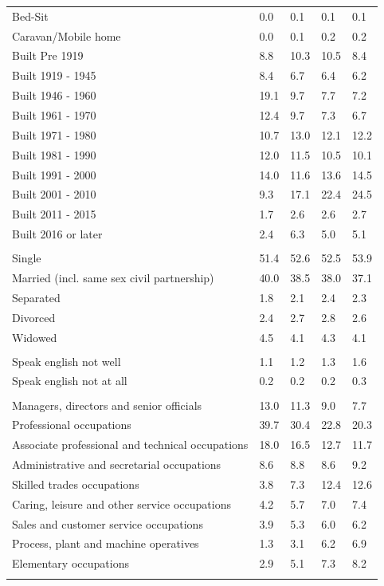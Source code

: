 \documentclass{article}
\begin{document}
\begin{table}[h]
\begin{tabular}{KTTTT}
Bed-Sit & 0.0& 0.1& 0.1& 0.1\\
Caravan/Mobile home & 0.0& 0.1& 0.2& 0.2\\
    \hline
Built Pre 1919 &  8.8& 10.3& 10.5&  8.4\\
Built 1919 - 1945 & 8.4& 6.7& 6.4& 6.2\\
Built  1946 - 1960 & 19.1&  9.7&  7.7&  7.2\\
Built  1961 - 1970 & 12.4&  9.7&  7.3&  6.7\\
Built  1971 - 1980 & 10.7& 13.0& 12.1& 12.2\\
Built  1981 - 1990 & 12.0& 11.5& 10.5& 10.1\\
Built  1991 - 2000 & 14.0& 11.6& 13.6& 14.5\\
Built  2001 - 2010 &  9.3& 17.1& 22.4& 24.5\\
Built  2011 - 2015 & 1.7& 2.6& 2.6& 2.7\\
Built  2016 or later & 2.4& 6.3& 5.0& 5.1\\
\hline
    \\
    \hline
Single & 51.4& 52.6& 52.5& 53.9\\
Married (incl. same sex civil partnership) & 40.0& 38.5& 38.0& 37.1\\
Separated  & 1.8& 2.1& 2.4& 2.3\\
Divorced  & 2.4& 2.7& 2.8& 2.6\\
Widowed & 4.5& 4.1& 4.3& 4.1\\
\hline
    \\ 
    \hline
Speak english not well & 1.1& 1.2& 1.3& 1.6\\
Speak english not at all & 0.2& 0.2& 0.2& 0.3\\
\hline
    \\
    \hline
Managers, directors and senior officials & 13.0& 11.3&  9.0&  7.7\\
Professional occupations & 39.7& 30.4& 22.8& 20.3\\
Associate professional and technical occupations & 18.0& 16.5& 12.7& 11.7\\
Administrative and secretarial occupations & 8.6& 8.8& 8.6& 9.2\\
Skilled trades occupations &  3.8&  7.3& 12.4& 12.6\\
Caring, leisure and other service occupations & 4.2& 5.7& 7.0& 7.4\\
Sales and customer service occupations & 3.9& 5.3& 6.0& 6.2\\
Process, plant and machine operatives & 1.3& 3.1& 6.2& 6.9\\
Elementary occupations & 2.9& 5.1& 7.3& 8.2\\
\hline
\end{tabular}
\end{table}
\end{document}
